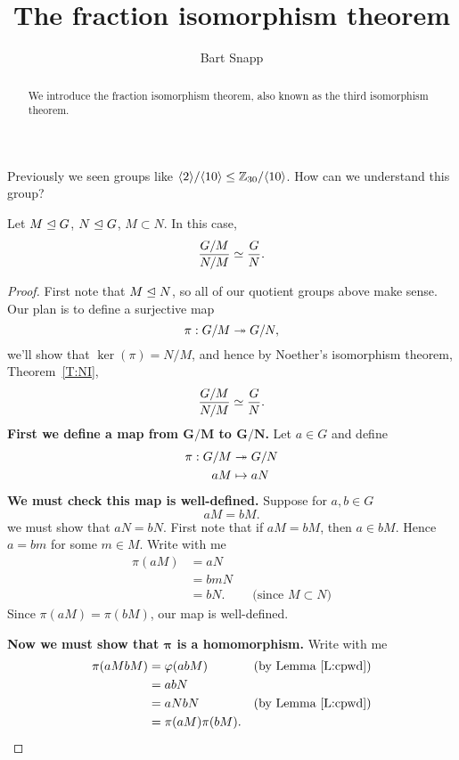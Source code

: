 \documentclass{ximera}
\author{Bart Snapp}
\title{The fraction isomorphism theorem}
\begin{document}
\begin{abstract}
  We introduce the fraction isomorphism theorem, also known as the
  third isomorphism theorem.
\end{abstract}
\maketitle


Previously we seen groups like $\<2\>/\<10\>\subgp
\Z_{30}/\<10\>$. How can we understand this group?




\begin{theorem}
  Let $M\normal G$, $N\normal G$, $M\subset N$. In this case,
  \[
  \frac{G/M}{N/M} \iso \frac{G}{N}.
  \]
  \begin{proof}
    First note that $M\normal N$, so all of our quotient groups above
    make sense. Our plan is to define a surjective map
    \[
    \pi:G/M \onto G/N,
    \]
    we'll show that $\ker(\pi) = N/M$, and hence by Noether's
    isomorphism theorem, Theorem~\ref{T:NI},
    \[
    \frac{G/M}{N/M} \iso \frac{G}{N}.
    \]
    \textbf{First we define a map from $\boldsymbol{G/M}$ to
      $\boldsymbol{G/N}$.} Let $a\in G$ and define
    \begin{align*}
      \pi: G/M &\onto G/N \\
      aM &\mapsto aN
    \end{align*}
    \textbf{We must check this map is
      well-defined.} Suppose for $a,b\in G$
    \[
    a M = bM.
    \]
    we must show that $aN = bN$. First note that if $aM = bM$, then $a
    \in bM$. Hence $a=bm$ for some $m\in M$. Write with me
    \begin{align*}
      \pi(aM) &= aN\\
      &= bm N\\
      &= bN.  & &\text{(since $M\subset N$)}
    \end{align*}
    Since $\pi(a M) = \pi(bM)$, our map is well-defined.

    \textbf{Now we must show that $\boldsymbol\pi$ is a homomorphism.}
    Write with me
    \begin{align*}
      \pi(aMbM) &= \phi(ab M) & &\text{(by  Lemma~\ref{L:cpwd})} \\
      &= ab N \\
      &= aN bN & &\text{(by  Lemma~\ref{L:cpwd})} \\
      &= \pi(aM)\pi(bM).
    \end{align*}



\end{proof}
\end{theorem}
\end{document}
